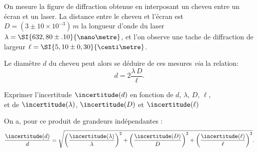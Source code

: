 \hauteurLargeurCadreReponse		{7mm}{7cm}
\initialisationEntrainement


\debutEntrainement

On mesure la figure de diffraction obtenue en interposant un cheveu entre un écran et un laser.
La distance entre le cheveu et l'écran est $D=(3 \pm 10 \times 10^{-3} )\,\si{m}$
 la longueur d'onde du laser \( \lambda= \SI{632,80 \pm .10}{\nano\metre}  \), et l'on observe une tache de diffraction de largeur \(\ell=\SI{5,10\pm 0,30}{\centi\metre} \).

Le diamètre $d$ du cheveu peut alors se déduire de ces mesures \emph{via} la relation:
\[
  d=2\frac{\lambda\,D}{\ell}.
\]



\begin{enonce}
Exprimer l'incertitude $\incertitude(d)$ en fonction de $d$, $\lambda$, $D$, $\ell$, \minusSmallskip \\ et de $\incertitude(\lambda)$, $\incertitude(D)$ et $\incertitude(\ell)$
\end{enonce}


\begin{corrige}
On a, pour ce produit de grandeurs indépendantes : \vspace{-2mm}
\[
\frac{\incertitude(d)}{d}=
\sqrt{
\left(\frac{\incertitude(\lambda)}{\lambda}\right)^2 +
\left(\frac{\incertitude(D)}{D}\right)^2 +
\left(\frac{\incertitude(\ell)}{\ell}\right)^2 }.
\]
\end{corrige}




